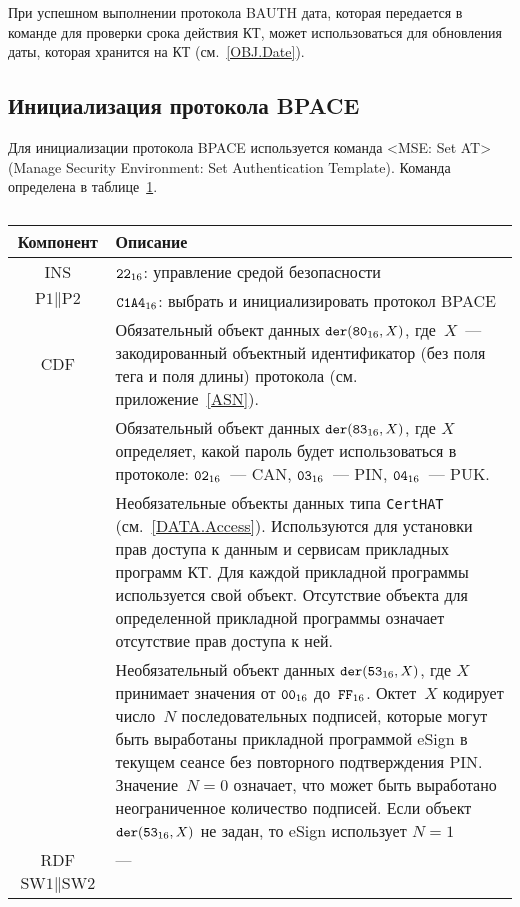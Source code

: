 При успешном выполнении протокола BAUTH дата, которая передается в команде 
для проверки срока действия КТ, может использоваться для обновления 
даты, которая хранится на КТ (см.~\ref{OBJ.Date}). 

\subsection{Инициализация протокола BPACE}
\label{Oper.Descr.SetBPACE}

Для инициализации протокола BPACE используется команда
<MSE: Set AT> (Manage Security Environment: Set Authentication Template). 
%
Команда определена в таблице~\ref{Table.Oper.SetBPACECmd}. 

\begin{table}[H]
\caption{}\label{Table.Oper.SetBPACECmd}
\begin{tabular}{|c|p{14cm}|}
\hline
Компонент & Описание \\
\hline
\hline
INS & $\texttt{22}_{16}$: управление средой безопасности\\ 
\hline
$\text{P1} \parallel\text{P2}$ & $\texttt{C1A4}_{16}$: выбрать и 
инициализировать протокол BPACE\\ 
\hline
CDF & Обязательный объект данных 
$\texttt{der}(\texttt{80}_{16}, X)$, где~$X$~--- 
закодированный объектный идентификатор (без поля тега и поля 
длины) протокола (см. приложение~\ref{ASN}).\\
& Обязательный объект данных $\texttt{der}(\texttt{83}_{16}, X)$, 
где $X$ определяет, какой пароль будет использоваться в протоколе: 
$\texttt{02}_{16}$~--- CAN,  $\texttt{03}_{16}$~--- PIN, 
$\texttt{04}_{16}$~--- PUK.\\
 & Необязательные объекты данных типа \verb|CertHAT| (см.~\ref{DATA.Access}). 
Используются для установки прав доступа к данным и сервисам 
прикладных программ КТ. 
Для каждой прикладной программы используется свой объект.
Отсутствие объекта для определенной прикладной
программы означает отсутствие прав доступа к ней. \\
 & Необязательный объект данных $\texttt{der}(\texttt{53}_{16}, X)$, 
где $X$ принимает значения от $\texttt{00}_{16}$ до~$\texttt{FF}_{16}$.
Октет~$X$ кодирует число~$N$ последовательных подписей,  
которые могут быть выработаны прикладной программой eSign
в текущем сеансе без повторного подтверждения PIN.
%
Значение~$N=0$ означает, что может быть выработано 
неограниченное количество подписей. 
%
Если объект $\texttt{der}(\texttt{53}_{16}, X)$ не задан, то eSign 
использует $N=1$\\
\hline 
\hline
RDF &  --- \\
\hline
$\text{SW1} \parallel \text{SW2}$ & 

\end{tabular}
\end{table}
